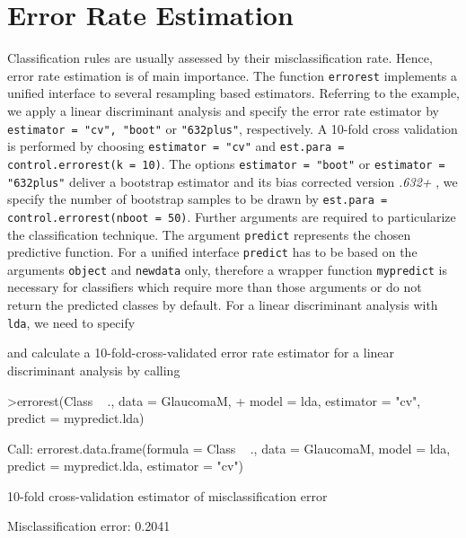 \documentclass[11pt]{article}
\begin{document}
\section{Error Rate Estimation}
Classification rules are usually assessed by their misclassification rate. 
Hence, error rate estimation is of main importance. 
The function \texttt{errorest} implements a unified interface to several
resampling based estimators. Referring to the example, we apply a linear
discriminant analysis and specify the error rate estimator 
by \texttt{estimator = "cv", "boot"} or \texttt{"632plus"}, 
respectively. A 10-fold cross validation is performed by 
choosing \texttt{estimator = "cv"} and 
\texttt{est.para = control.errorest(k = 10)}. The options \texttt{estimator = "boot"} or 
\texttt{estimator = "632plus"} deliver a bootstrap estimator 
and its  bias corrected version {\sl .632+} \citep[see][]{efron:1997}, 
we specify the number of bootstrap samples to be drawn by 
\texttt{est.para = control.errorest(nboot = 50)}. 
Further arguments are required to particularize the 
classification technique. The argument \texttt{predict} represents 
the chosen predictive function. For a unified interface 
\texttt{predict} has to be based on the arguments \texttt{object} 
and \texttt{newdata} only, therefore a wrapper function \texttt{mypredict} is necessary for classifiers 
which require more than those arguments or do not return the predicted
classes by default. For a linear discriminant analysis with \texttt{lda}, we
need to specify  
\begin{Schunk}
\end{Schunk}
and calculate a 10-fold-cross-validated error rate estimator 
for a linear discriminant analysis by calling 
\begin{Schunk}
\begin{Sinput}
>errorest(Class ~ ., data = GlaucomaM, 
+     model = lda, estimator = "cv", predict = mypredict.lda)
\end{Sinput}
\begin{Soutput}
Call:
errorest.data.frame(formula = Class ~ ., data = GlaucomaM, model = lda, 
    predict = mypredict.lda, estimator = "cv")

	 10-fold cross-validation estimator of misclassification error 

Misclassification error:  0.2041 
\end{Soutput}
\end{Schunk}
\end{document}
